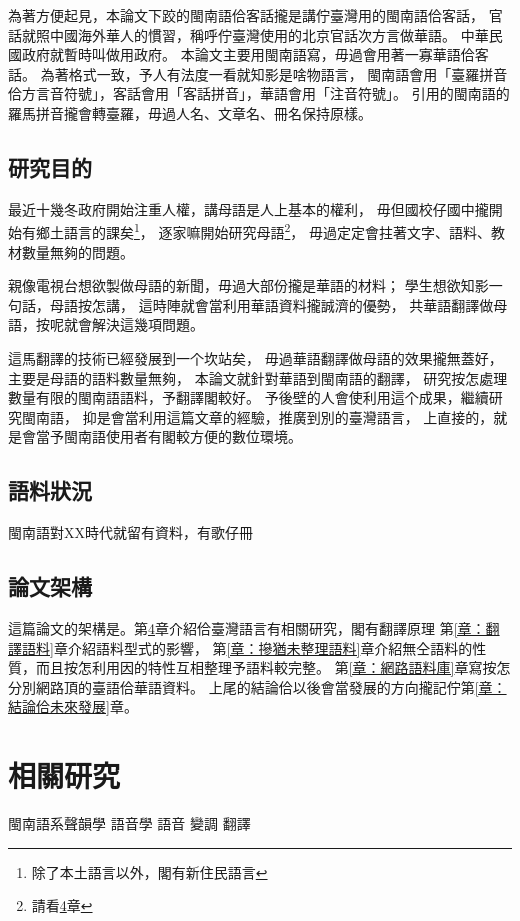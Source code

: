 \documentclass[final,oneside,onecolumn,12pt,a4paper]{book}%
\begin{document}
為著方便起見，本論文下跤的閩南語佮客話攏是講佇臺灣用的閩南語佮客話，
官話就照中國海外華人的慣習，稱呼佇臺灣使用的北京官話次方言做華語。
中華民國政府就暫時叫做用政府。
本論文主要用閩南語寫，毋過會用著一寡華語佮客話。
為著格式一致，予人有法度一看就知影是啥物語言，
閩南語會用「臺羅拼音\cite{}佮方言音符號\cite{}」，客話會用「客話拼音\cite{}」，華語會用「注音符號\cite{}」。
引用的閩南語的羅馬拼音攏會轉臺羅，毋過人名、文章名、冊名保持原樣。

\section{研究目的}
\label{節：研究目的}
最近十幾冬政府開始注重人權，講母語是人上基本的權利，
毋但國校仔國中攏開始有鄉土語言的課矣\footnote{除了本土語言以外，閣有新住民語言}，
逐家嘛開始研究母語\footnote{請看\ref{章：相關研究}章}，
毋過定定會拄著文字、語料、教材數量無夠的問題。

親像電視台想欲製做母語的新聞，毋過大部份攏是華語的材料；
學生想欲知影一句話，母語按怎講，
這時陣就會當利用華語資料攏誠濟的優勢，
共華語翻譯做母語，按呢就會解決這幾項問題。

這馬翻譯的技術已經發展到一个坎站矣，
毋過華語翻譯做母語的效果攏無蓋好，
主要是母語的語料數量無夠，
本論文就針對華語到閩南語的翻譯，
研究按怎處理數量有限的閩南語語料，予翻譯閣較好。
予後壁的人會使利用這个成果，繼續研究閩南語，
抑是會當利用這篇文章的經驗，推廣到別的臺灣語言，
上直接的，就是會當予閩南語使用者有閣較方便的數位環境。

\section{語料狀況}
\label{節：語料狀況}
閩南語對XX時代就留有資料，有歌仔冊


\section{論文架構}
\label{節：論文架構}

這篇論文的架構是。第\ref{章：相關研究}章介紹佮臺灣語言有相關研究，閣有翻譯原理
第\ref{章：翻譯語料}章介紹語料型式的影響，
第\ref{章：摻猶未整理語料}章介紹無仝語料的性質，而且按怎利用因的特性互相整理予語料較完整。
第\ref{章：網路語料庫}章寫按怎分別網路頂的臺語佮華語資料。
上尾的結論佮以後會當發展的方向攏記佇第\ref{章：結論佮未來發展}章。

\chapter{相關研究}
\label{章：相關研究}
閩南語系聲韻學
語音學
語音
變調
翻譯
\end{document}
